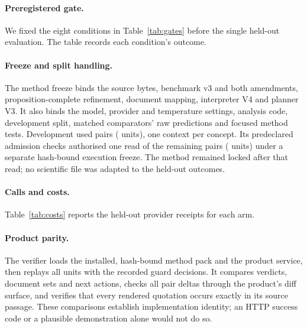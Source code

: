 \paragraph{Preregistered gate.}
We fixed the eight conditions in Table~\ref{tab:gates} before the single
held-out evaluation. The table records each condition's outcome.
\begin{table}[htb]
\centering\small

\caption{The eight preregistered conditions and their outcomes. Provenance,
volume and pairing conditions pass; broad-superiority conditions fail.}
\label{tab:gates}
\end{table}

\paragraph{Freeze and split handling.}
The method freeze  binds the source
bytes, benchmark v3 and both amendments, proposition-complete refinement,
document mapping, interpreter V4 and planner V3. It also binds the model,
provider and temperature settings, analysis code, development split,
matched comparators' raw predictions and focused method tests.
Development used \nPairsDev{} pairs (\nUnitsDev{} units), one context per
concept. Its predeclared admission checks authorised one read of the
remaining \nPairsHid{} pairs (\nUnitsHid{} units) under a separate
hash-bound execution freeze. The method remained locked after that read;
no scientific file was adapted to the held-out outcomes.

\paragraph{Calls and costs.}
\label{app:costs}
Table~\ref{tab:costs} reports the held-out provider receipts for each arm.
\begin{table}[htb]
\centering\small

\caption{Held-out calls and provider-reported charges for
\texttt{\cpModel} at temperature $0$, with one logged attempt per call.
Evidence-first allows \efMaxTokExtract{} completion tokens for extraction
and \efMaxTokPlan{} for planning. \casepath allows \cpMaxTokGuard{} per
guard batch; Direct and Graph as context allow \dirMaxTokCall{} per call.
The charges exclude source preparation, and computation differs across arms.}
\label{tab:costs}
\end{table}

\paragraph{Product parity.}
The verifier loads the installed, hash-bound method pack and the product
service, then replays all \parityUnits{} units with the recorded guard
decisions. It compares verdicts, document sets and next actions, checks
all \parityPairs{} pair deltas through the product's diff surface, and
verifies that every rendered quotation occurs exactly in its source passage.
These comparisons establish implementation identity; an HTTP success code
or a plausible demonstration alone would not do so.

